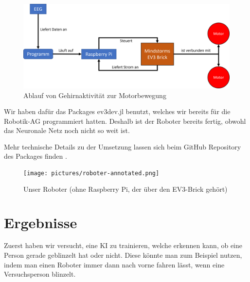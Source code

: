 \documentclass{scrartcl}
\begin{document}
	\begin{figure}[h!]
		\includegraphics[width=1\textwidth]{pictures/roboter-funktionsweise.png}
		\caption{Ablauf von Gehirnaktivität zur Motorbewegung}
	\end{figure}

	Wir haben dafür das Packages ev3dev.jl benutzt, welches wir bereits für die Robotik-AG programmiert hatten. Deshalb ist der Roboter bereits fertig, obwohl das Neuronale Netz noch nicht so weit ist.

	Mehr technische Details zu der Umsetzung lassen sich beim GitHub Repository des Packages finden \cite{ev3dev}.

	\begin{figure}[h!]
		\texttt{[image: pictures/roboter-annotated.png]}
		\caption{Unser Roboter (ohne Raspberry Pi, der über den EV3-Brick gehört)}
	\end{figure}


	
	\newpage

	\section{Ergebnisse}

	Zuerst haben wir versucht, eine KI zu trainieren, welche erkennen kann, ob eine Person gerade geblinzelt hat oder nicht. Diese könnte man zum Beispiel nutzen, indem man einen Roboter immer dann nach vorne fahren lässt, wenn eine Versuchsperson blinzelt.
\end{document}
